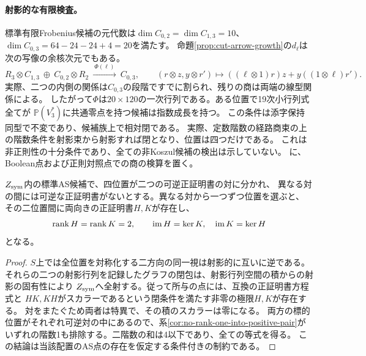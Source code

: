 \paragraph{射影的な有限検査。}
標準有限Frobenius候補の元代数は$\dim C_{0,2}=\dim C_{1,3}=10$、
$\dim C_{0,3}=64-24-24+4=20$を満たす。
命題\ref{prop:cut-arrow-growth}の$d_\ell$は次の写像の余核次元でもある。
\[
 R_3\otimes C_{1,3}\ \oplus\ C_{0,2}\otimes R_2
 \ \xrightarrow{\ \Phi(\ell)\ }\ C_{0,3},\qquad
 (r\otimes z,y\otimes r')\longmapsto
 ((\ell\otimes1)r)z+y((1\otimes\ell)r').
\]
実際、二つの内側の関係は$C_{0,3}$の段階ですでに割られ、残りの商は両端の線型関係による。
したがって$\Phi$は$20\times120$の一次行列である。ある位置で19次小行列式全てが
$\mathbb P(V_3^*)$に共通零点を持つ候補は指数成長を持つ。
この条件は添字保持同型で不変であり、候補族上で相対閉である。
実際、定数階数の経路商束の上の階数条件を射影束から射影すれば閉となり、位置は四つだけである。
これは非正則性の十分条件であり、全ての非Koszul候補の検出は示していない。
に、Boolean点および正則対照点での商の検算を置く。

\begin{corollary}[対称閉包内の二対二の可逆証明書]\label{cor:two-pairs-transfer-ranks}
$Z_{\rm sym}$内の標準AS候補で、四位置が二つの可逆正証明書の対に分かれ、
異なる対の間には可逆な正証明書がないとする。異なる対から一つずつ位置を選ぶと、
その二位置間に両向きの正証明書$H,K$が存在し、
\[
 \operatorname{rank} H=\operatorname{rank} K=2,\qquad \operatorname{im}H=\ker K,\quad
 \operatorname{im}K=\ker H
\]
となる。
\end{corollary}
\begin{proof}
$S$上では全位置を対称化する二方向の同一視は射影的に互いに逆である。
それらの二つの射影行列を記録したグラフの閉包は、射影行列空間の積からの射影の固有性により
$Z_{\rm sym}$へ全射する。従って所与の点には、互換の正証明書方程式と
$HK,KH$がスカラーであるという閉条件を満たす非零の極限$H,K$が存在する。
対をまたぐため両者は特異で、その積のスカラーは零になる。
両方の標的位置がそれぞれ可逆対の中にあるので、系\ref{cor:no-rank-one-into-positive-pair}が
いずれの階数1も排除する。二階数の和は4以下であり、全ての等式を得る。
この結論は当該配置のAS点の存在を仮定する条件付きの制約である。
\end{proof}

